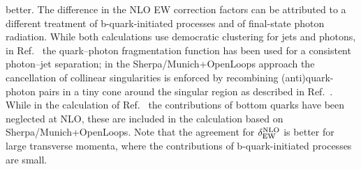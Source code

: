 \documentclass[11pt]{cernrep}
\begin{document}
better.  The difference in the NLO EW correction factors can be
attributed to a different treatment of b-quark-initiated processes and
of final-state photon radiation. While both calculations use
democratic clustering for jets and photons, in
Ref.~\cite{Denner:2014ina} the quark--photon fragmentation function
has been used for a consistent photon--jet separation; in the {\sc
  Sherpa/Munich+OpenLoops} approach the cancellation of collinear
singularities is enforced by recombining (anti)quark-photon pairs in a
tiny cone around the singular region as described in
Ref.~\cite{Kallweit:2014xda}.  While in the calculation of
Ref.~\cite{Denner:2014ina} the contributions of bottom quarks have
been neglected at NLO, these are included in the calculation based on
{\sc Sherpa/Munich+OpenLoops}.  Note that the agreement for
$\delta^{\rm NLO}_{\rm EW}$ is better for large transverse momenta,
where the contributions of b-quark-initiated processes are small.


\end{document}
